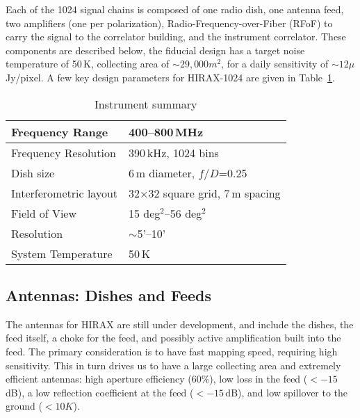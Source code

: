 \documentclass[]{spie}  %
\begin{document}
Each of the 1024 signal chains is composed of one radio dish, one antenna feed, two amplifiers (one per polarization), Radio-Frequency-over-Fiber (RFoF) to carry the signal to the correlator building, and the instrument correlator. These components are described below, the fiducial design has a target noise temperature of 50\,K, collecting area of $\sim29,000m^{2}$, for a daily sensitivity of $\sim 12 \mu$Jy/pixel. A few key design parameters for HIRAX-1024 are given in Table~\ref{tab:salient}.

\begin{table}[ht]
\caption{Instrument summary} 
\label{tab:salient}
\begin{center}       
\begin{tabular}{|l|l|} 
\hline
\rule[-1ex]{0pt}{3.5ex}  Frequency Range & 400--800\,MHz  \\
\hline
\rule[-1ex]{0pt}{3.5ex}  Frequency Resolution & 390\,kHz, 1024 bins \\
\hline
\rule[-1ex]{0pt}{3.5ex}  Dish size & 6\,m diameter, $f/D$=0.25 \\
\hline
\rule[-1ex]{0pt}{3.5ex}  Interferometric layout & 32$\times$32 square grid, 7\,m spacing  \\
\hline
\rule[-1ex]{0pt}{3.5ex}  Field of View & 15 deg$^{2}$--56 deg$^{2}$ \\
\hline
\rule[-1ex]{0pt}{3.5ex}  Resolution & $\sim$5'--10'  \\
\hline 
\rule[-1ex]{0pt}{3.5ex}  System Temperature & 50\,K   \\
\hline 
\end{tabular}
\end{center}
\end{table}


\subsection{Antennas: Dishes and Feeds}

The antennas for HIRAX are still under development, and include the dishes, the feed itself, a choke for the feed, and possibly active amplification built into the feed. The primary consideration is to have fast mapping speed, requiring high sensitivity. This in turn drives us to have a large collecting area and extremely efficient antennas: high aperture efficiency (60\%), low loss in the feed ($<-15$\,dB), a low reflection coefficient at the feed ($<-15$\,dB), and low spillover to the ground ($<10K$). \newline
\end{document}
